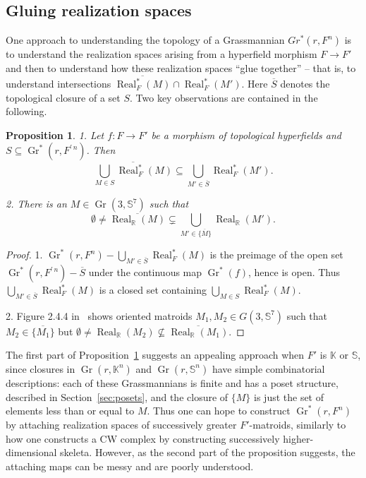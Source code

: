 \documentclass[10pt, preprint]{article}
\newtheorem{prop}[theorem]{Proposition}
\theoremstyle{definition}
\begin{document}
\subsection{Gluing realization spaces}

One approach to understanding the topology of a Grassmannian
$Gr^{*}(r, F^{n})$ is to understand the realization spaces arising from
a hyperfield morphism $F\to F'$ and then to understand how these
realization spaces ``glue together'' -- that is, to understand
intersections $\overline{\operatorname{Real}^{*}_{F}(M)}\cap
\operatorname{Real}^{*}_{F}(M')$. Here $\overline{S}$ denotes the
topological closure of a set $S$. Two key observations are contained in
the following.

\begin{prop}
\label{prop:glue}
1. Let $f:F\to F'$ be a morphism of topological hyperfields and
$S\subseteq \operatorname{Gr}^{*}(r, F^{\prime \,n})$. Then
%
\begin{equation*}
\overline{\bigcup _{M\in S}\operatorname{Real}^{*}_{F}(M)}\subseteq
\bigcup _{M'\in \overline{S}}\operatorname{Real}^{*}_{F}(M').
\end{equation*}

2. There is an $M\in \operatorname{Gr}(3,\mathbb{S}^{7})$ such that
%
\begin{equation*}
\emptyset \neq \overline{\operatorname{Real}_{\mathbb{R}}(M)}\subsetneq
\bigcup _{M'\in \overline{\{M\}}}\operatorname{Real}_{\mathbb{R}}(M').
\end{equation*}
%
\end{prop}

\begin{proof}
1. $\operatorname{Gr}^{*}(r, F^{n})-\bigcup _{M'\in \overline{S}}
\operatorname{Real}^{*}_{F}(M)$ is the preimage of the open set
$\operatorname{Gr}^{*}(r, F^{\prime \,n})-\overline{S}$ under the continuous map
$\operatorname{Gr}^{*}(f)$, hence is open. Thus
$\bigcup _{M'\in \overline{S}}\operatorname{Real}^{*}_{F}(M)$ is a closed
set containing $\bigcup _{M\in S}\operatorname{Real}^{*}_{F}(M)$.

2. Figure 2.4.4 in~\cite{BLSWZ} shows oriented matroids
$M_{1},M_{2}\in G(3,\mathbb{S}^{7})$ such that $M_{2}\in \overline{\{M
_{1}\}}$ but $\emptyset \neq \operatorname{Real}_{\mathbb{R}}(M_{2})
\nsubseteq \overline{\operatorname{Real}_{\mathbb{R}}(M_{1})}$.
\end{proof}

The first part of Proposition~\ref{prop:glue} suggests an appealing
approach when $F'$ is $\mathbb{K}$ or $\mathbb{S}$, since closures in
$\operatorname{Gr}(r, \mathbb{K}^{n})$ and $\operatorname{Gr}(r,
\mathbb{S}^{n})$ have simple combinatorial descriptions: each of these
Grassmannians is finite and has a poset structure, described in
Section~\ref{sec:posets}, and the closure of $\{M\}$ is just the set of
elements less than or equal to $M$. Thus one can hope to construct
$\operatorname{Gr}^{*}(r, F^{n})$ by attaching realization spaces of
successively greater $F'$-matroids, similarly to how one constructs a
CW complex by constructing successively higher-dimensional skeleta.
However, as the second part of the proposition suggests, the attaching
maps can be messy and are poorly understood.
\end{document}
